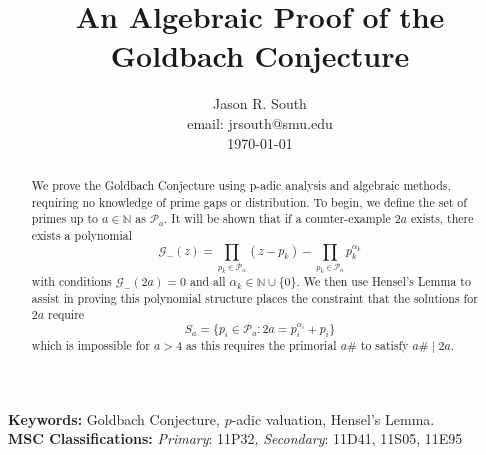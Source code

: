 \documentclass[12pt,a4paper]{amsart}
\numberwithin{equation}{section}
\theoremstyle{theorem}
\theoremstyle{definition}
\theoremstyle{remark}
\theoremstyle{con}
\begin{document}
\title{An Algebraic Proof of the Goldbach Conjecture}
\author{Jason R. South \\
\lowercase{email: jrsouth@smu.edu}
\\\today{\vspace{-5ex}}}

\thispagestyle{plain}
\maketitle
\pagestyle{plain}




\maketitle





\begin{abstract}
We prove the Goldbach Conjecture using p-adic analysis and algebraic methods, requiring no knowledge of prime gaps or distribution. To begin, we define the set of primes up to $a \in \mathbb{N}$ as $\mathcal{P}_a$. It will be shown that if a counter-example $2a$ exists, there exists a polynomial 
\[
 \mathcal{G}_-(z) = \prod_{p_k \in \mathcal{P}_a} (z - p_k) - \prod_{p_k \in \mathcal{P}_a}p_k^{\alpha_k} 
 \]
with conditions $\mathcal{G}_-(2a) = 0$ and all $\alpha_k \in \mathbb{N} \cup \{0\}$. We then use Hensel's Lemma to assist in proving this polynomial structure places the constraint that the solutions for $2a$ require 
\[
S_a = \{p_i \in \mathcal{P}_a : 2a = p_i^{\alpha_i} + p_i \}
\]
which is impossible for $a > 4$ as this requires the primorial $a\#$ to satisfy $a\# \; |\; 2a$.
\end{abstract}


 \noindent\small
\textbf{Keywords:} Goldbach Conjecture, $p$-adic valuation, Hensel's Lemma.
\\
\textbf{MSC Classifications:} 
\textit{Primary}: 11P32, \textit{Secondary}: 11D41, 11S05, 11E95
\normalsize


\pagestyle{headings}

\thispagestyle{empty}
\baselineskip=12.875pt



\end{document}
